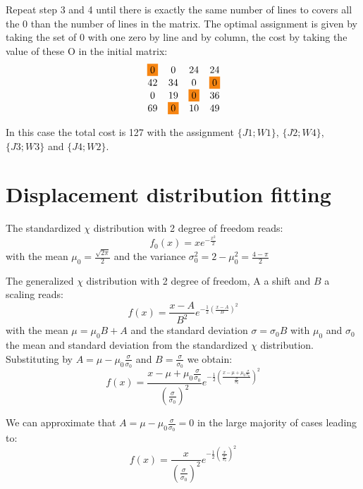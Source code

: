 \begin{appendices}
        Repeat step 3 and 4 until there is exactly the same number of lines to covers all the 0 than the number of lines in the matrix. The optimal assignment is given by taking the set of 0 with one zero by line and by column, the cost by taking the value of these O in the initial matrix:
        $$\begin{matrix}
        \colorbox{BurntOrange}{0} & 0 & 24 & 24 \\
        42 & 34 & 0 & \colorbox{BurntOrange}{0} \\
        0 & 19 & \colorbox{BurntOrange}{0} & 36 \\
        69 & \colorbox{BurntOrange}{0} & 10 & 49
        \end{matrix}$$

        \noindent In this case the total cost is 127 with the assignment $\{J1; W1\}$, $\{J2; W4\}$, $\{J3; W3\}$ and $\{J4; W2\}$.


        \chapter{Displacement distribution fitting}
        \label{part_1:annexe_chi}

        The standardized $\chi$ distribution with 2 degree of freedom reads:
        \begin{equation}
        f_0(x)=xe^{-\frac{x^2}{2}}
        \end{equation}
        \noindent with the mean $\mu_0=\frac{\sqrt{2\pi}}{2}$ and the variance $\sigma_0^2=2-\mu_0^2=\frac{4-\pi}{2}$

        The generalized $\chi$ distribution with 2 degree of freedom, A a shift and $B$ a scaling reads:
        $$f(x)=\frac{x-A}{B^2}e^{-\frac{1}{2}(\frac{x-A}{B})^2}$$
        \noindent with the mean $\mu=\mu_0B+A$ and the standard deviation $\sigma=\sigma_0B$ with $\mu_0$ and $\sigma_0$ the mean and standard deviation from the standardized $\chi$ distribution.
        Substituting by $A=\mu-\mu_0\frac{\sigma}{\sigma_0}$ and $B=\frac{\sigma}{\sigma_0}$ we obtain:
        \begin{equation}
        f(x)=\frac{x-\mu+\mu_0\frac{\sigma}{\sigma_0}}{(\frac{\sigma}{\sigma_0})^2}e^{-\frac{1}{2}(\frac{x-\mu+\mu_0\frac{\sigma}{\sigma_0}}{\frac{\sigma}{\sigma_0}})^2}
        \label{eq1}
        \end{equation}

        We can approximate that $A=\mu-\mu_0\frac{\sigma}{\sigma_0}=0$ in the large majority of cases leading to:
        \begin{equation}
        f(x)=\frac{x}{(\frac{\sigma}{\sigma_0})^2}e^{-\frac{1}{2}(\frac{x}{\frac{\sigma}{\sigma_0}})^2}
        \label{eq1}
        \end{equation}

    \end{appendices}
